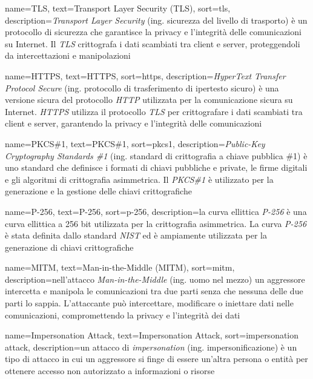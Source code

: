  {
    name=TLS,
    text=Transport Layer Security (TLS),
    sort=tls,
    description={\emph{Transport Layer Security} (ing. sicurezza del livello di trasporto) è un protocollo di sicurezza che garantisce la privacy e l'integrità delle comunicazioni su Internet. Il \emph{TLS} crittografa i dati scambiati tra client e server, proteggendoli da intercettazioni e manipolazioni}
}

 {
    name=HTTPS,
    text=HTTPS,
    sort=https,
    description={\emph{HyperText Transfer Protocol Secure} (ing. protocollo di trasferimento di ipertesto sicuro) è una versione sicura del protocollo \emph{HTTP} utilizzata per la comunicazione sicura su Internet. \emph{HTTPS} utilizza il protocollo \emph{TLS} per crittografare i dati scambiati tra client e server, garantendo la privacy e l'integrità delle comunicazioni}
}

 {
    name=PKCS\#1,
    text=PKCS\#1,
    sort=pkcs1,
    description={\emph{Public-Key Cryptography Standards \#1} (ing. standard di crittografia a chiave pubblica \#1) è uno standard che definisce i formati di chiavi pubbliche e private, le firme digitali e gli algoritmi di crittografia asimmetrica. Il \emph{PKCS\#1} è utilizzato per la generazione e la gestione delle chiavi crittografiche}
}

 {
    name=P-256,
    text=P-256,
    sort=p-256,
    description={la curva ellittica \emph{P-256} è una curva ellittica a 256 bit utilizzata per la crittografia asimmetrica. La curva \emph{P-256} è stata definita dallo standard \emph{NIST} ed è ampiamente utilizzata per la generazione di chiavi crittografiche}
}

 {
    name=MITM,
    text=Man-in-the-Middle (MITM),
    sort=mitm,
    description={nell'attacco \emph{Man-in-the-Middle} (ing. uomo nel mezzo) un aggressore intercetta e manipola le comunicazioni tra due parti senza che nessuna delle due parti lo sappia. L'attaccante può intercettare, modificare o iniettare dati nelle comunicazioni, compromettendo la privacy e l'integrità dei dati}
}

 {
    name=Impersonation Attack,
    text=Impersonation Attack,
    sort=impersonation attack,
    description={un attacco di \emph{impersonation} (ing. impersonificazione) è un tipo di attacco in cui un aggressore si finge di essere un'altra persona o entità per ottenere accesso non autorizzato a informazioni o risorse}
}

